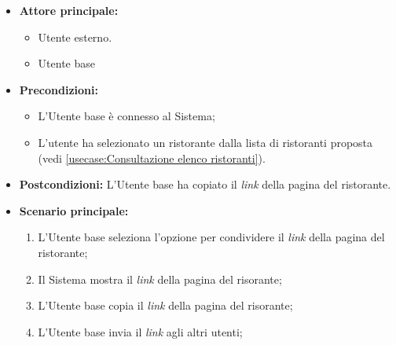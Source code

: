 \label{usecase:Condivisione link del ristorante}
\begin{itemize}
    \item \textbf{Attore principale:}    
	\begin{itemize}
        \item Utente esterno.
        \item Utente base
    \end{itemize}

	\item \textbf{Precondizioni:}
	\begin{itemize}
		\item L'Utente base è connesso al Sistema;
		\item L'utente ha selezionato un ristorante dalla lista di ristoranti proposta (vedi \autoref{usecase:Consultazione elenco ristoranti}).
	\end{itemize}

	\item \textbf{Postcondizioni:}
	      L'Utente base ha copiato il \textit{link} della pagina del ristorante.

	\item \textbf{Scenario principale:}
	      \begin{enumerate}
		      \item L'Utente base seleziona l'opzione per condividere il \textit{link} della pagina del ristorante;
		      \item Il Sistema mostra il \textit{link} della pagina del risorante;
		      \item L'Utente base copia il \textit{link} della pagina del risorante;
		      \item L'Utente base invia il \textit{link} agli altri utenti;
	      \end{enumerate}
\end{itemize}